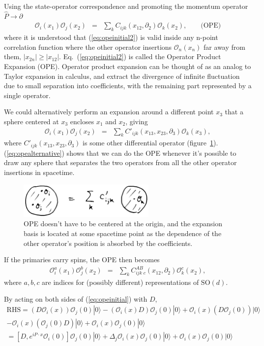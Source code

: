 \documentclass[12pt]{article}
\numberwithin{equation}{section}
\newcommand\be{\begin{eqnarray}}
\newcommand\ee{\end{eqnarray}}
\newcommand\cO{\mathcal{O}}
\newcommand\ptl\partial
\newcommand\<\langle
\renewcommand\>\rangle
\renewcommand\.{\cdot}
\newcommand\SO{\mathrm{SO}}
\begin{document}
Using the state-operator correspondence and promoting the momentum operator $\hat{P}\rightarrow\partial$
\be
\label{eq:opeinitial2}
\cO_i(x_1)\cO_j(x_2) &=& \sum_{k}C_{ijk}(x_{12},\ptl_2)\cO_k(x_2),\qquad\textrm{(OPE)}
\ee
where it is understood that (\ref{eq:opeinitial2}) is valid inside any n-point correlation function where the other operator insertions $\cO_n(x_n)$ far away from them, $|x_{2n}| \geq |x_{12}|$. Eq.~(\ref{eq:opeinitial2}) is called the Operator Product Expansion (OPE). Operator product expansion can be thought of as an analog to Taylor expansion in calculus, and extract the divergence of infinite fluctuation due to small separation into coefficients, with the remaining part represented by a single operator.

We could alternatively perform an expansion around a different point $x_3$ that a sphere centered at $x_3$ encloses $x_1$ and $x_2$, giving
\be
\label{eq:opealternative}
\cO_i(x_1)\cO_j(x_2) &=& \sum_k C'_{ijk}(x_{13},x_{23},\ptl_3)\cO_k(x_3),
\ee
where $C'_{ijk}(x_{13},x_{23},\ptl_3)$ is some other differential operator (figure~\ref{fig:radialquantotherpoint}). (\ref{eq:opealternative}) shows that we can do the OPE whenever it's possible to draw any sphere that separates the two operators from all the other operator insertions in spacetime.

\begin{figure}[h]
\begin{center}
\includegraphics[width=0.6\textwidth]{radialquantotherpoint.jpg}
\end{center}
\caption{OPE doesn't have to be centered at the origin, and the expansion basis is located at some spacetime point as the dependence 
 of the other operator's position is absorbed by the coefficients. \label{fig:radialquantotherpoint}}
\end{figure}

If the primaries carry spins, the OPE then becomes
\be
\cO_i^a(x_1)\cO_j^b(x_2) &=& \sum_k C_{ijk}^{AB}{}_c(x_{12},\ptl_2)\cO_k^c(x_2),
\ee
where $a,b,c$ are indices for (possibly different) representations of $\SO(d)$.

By acting on both sides of (\ref{eq:opeinitial}) with $D$,
\[
\begin{split}
\text{RHS} = 
\left(D\cO_i(x)\right)\cO_j(0)|0\> - \left(\cO_i(x)D\right)\cO_j(0)|0\> + \cO_i(x)\left(D\cO_j(0)\right)|0\>
\\
-\cO_i(x)\left(\cO_j(0)D\right)|0\> + \cO_i(x)\cO_j(0)|0\>
\\
= \left[D,e^{iP\cdot x}\cO_{i}(0)\right]\cO_j(0)|0\>+\Delta_{j}\cO_i(x)\cO_j(0)|0\> + \cO_i(x)\cO_j(0)|0\>
\end{split}
\]
\end{document}
